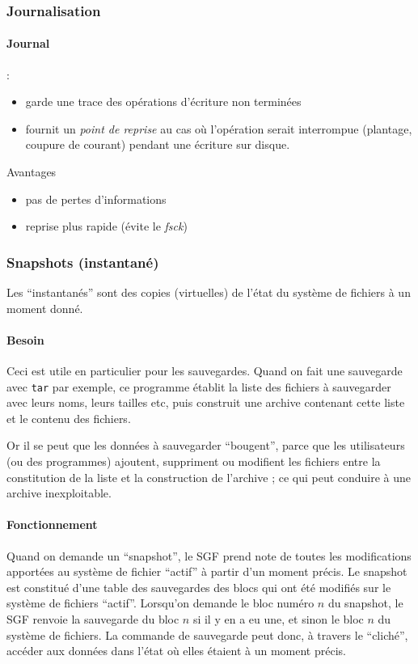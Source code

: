 \begin{multicols}{2}
\subsubsection{Journalisation}


\paragraph*{Journal} : 
\begin{itemize} 
\item garde une trace des opérations d'écriture non terminées
\item fournit un \emph{point de reprise} au cas où l'opération 
serait interrompue
(plantage, coupure de courant) pendant une écriture sur disque.
\end{itemize}

Avantages
\begin{itemize}
\item pas de pertes d'informations
\item reprise plus rapide (évite le \emph{fsck})
\end{itemize}



\subsubsection{Snapshots (instantané)}

Les ``instantanés'' sont des copies (virtuelles) de l'état du système
de fichiers à un moment donné.

\paragraph{Besoin} Ceci est utile 
en particulier pour les sauvegardes.  Quand on fait une
sauvegarde avec \texttt{tar} par exemple, ce programme établit la
liste des fichiers à sauvegarder avec leurs noms, leurs tailles etc,
puis construit une archive contenant cette liste et le contenu des
fichiers.

Or il se peut que les données à sauvegarder ``bougent'', parce que les
utilisateurs (ou des programmes) ajoutent, suppriment ou modifient les
fichiers entre la constitution de la liste et la construction de l'archive ;
ce qui peut conduire à une archive inexploitable.

\paragraph{Fonctionnement} 
Quand on demande un ``snapshot'', le SGF prend note de toutes les
modifications apportées au système de fichier ``actif'' à partir d'un
moment précis.  Le snapshot est constitué d'une table des sauvegardes
des blocs qui ont été modifiés sur le système de fichiers ``actif''.
Lorsqu'on demande le bloc numéro $n$ du snapshot, le SGF renvoie la
sauvegarde du bloc $n$ si il y en a eu une, et sinon le bloc $n$ du
système de fichiers.  La commande de sauvegarde peut donc, à travers
le ``cliché'', accéder aux données dans l'état où elles étaient à un
moment précis.


\end{multicols}
